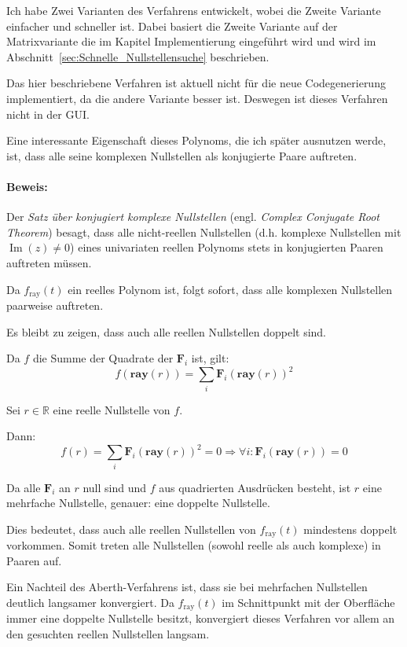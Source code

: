 \documentclass[
	ngerman,%
	accentcolor=9c,%
	ruledheaders=section,%
	class=report,%
	thesis={type=bachelor},%
	fontsize=11pt,%
	parskip=half-,%
	custommargins=true,%
	marginpar=false,%
]{tudapub}
\begin{document}
Ich habe Zwei Varianten des Verfahrens entwickelt, wobei die Zweite Variante einfacher und schneller ist. Dabei basiert die Zweite Variante auf der Matrixvariante die im Kapitel Implementierung eingeführt wird und wird im Abschnitt~\ref{sec:Schnelle_Nullstellensuche} beschrieben.

Das hier beschriebene Verfahren ist aktuell nicht für die neue Codegenerierung implementiert, da die andere Variante besser ist. Deswegen ist dieses Verfahren nicht in der GUI.

Eine interessante Eigenschaft dieses Polynoms, die ich später ausnutzen werde, ist, dass alle seine komplexen Nullstellen als konjugierte Paare auftreten.

\paragraph{Beweis:}

Der \textit{Satz über konjugiert komplexe Nullstellen} (engl. \textit{Complex Conjugate Root Theorem}) besagt, dass alle nicht-reellen Nullstellen (d.h. komplexe Nullstellen mit $\operatorname{Im}(z) \neq 0$) eines univariaten reellen Polynoms stets in konjugierten Paaren auftreten müssen.

Da $f_{\text{ray}}(t)$ ein reelles Polynom ist, folgt sofort, dass alle komplexen Nullstellen paarweise auftreten.

Es bleibt zu zeigen, dass auch alle reellen Nullstellen doppelt sind.

Da $f$ die Summe der Quadrate der $\mathbf{F}_i$ ist, gilt:
\[
f(\mathbf{ray}(r)) = \sum_i \mathbf{F}_i(\mathbf{ray}(r))^2
\]

Sei $r \in \mathbb{R}$ eine reelle Nullstelle von $f$.

Dann:
\[
f(r) = \sum_i \mathbf{F}_i(\mathbf{ray}(r))^2 = 0
\Rightarrow \forall i: \mathbf{F}_i(\mathbf{ray}(r)) = 0
\]

Da alle $\mathbf{F}_i$ an $r$ null sind und $f$ aus quadrierten Ausdrücken besteht, ist $r$ eine mehrfache Nullstelle, genauer: eine doppelte Nullstelle.

Dies bedeutet, dass auch alle reellen Nullstellen von $f_{\text{ray}}(t)$ mindestens doppelt vorkommen. Somit treten alle Nullstellen (sowohl reelle als auch komplexe) in Paaren auf.




Ein Nachteil des Aberth-Verfahrens ist, dass sie bei mehrfachen Nullstellen deutlich langsamer konvergiert. Da \( f_{\text{ray}}(t) \) im Schnittpunkt mit der Oberfläche immer eine doppelte Nullstelle besitzt, konvergiert dieses Verfahren vor allem an den gesuchten reellen Nullstellen langsam. 
\end{document}
